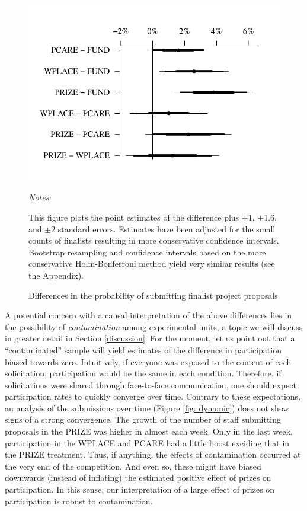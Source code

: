 \documentclass[12pt, titlepage]{article}
\newenvironment{tablenotes}[1][]{
  \begin{minipage}{\textwidth}\emph{Notes:}{\footnotesize #1}
}{\end{minipage}}
\begin{document}
\begin{figure} 
  \centering
  \caption{Differences in the probability of submitting finalist project proposals}
  \label{fig: finalist}
  \includegraphics{Figures/cplot-2.pdf}
  \begin{tablenotes}
  This figure plots the point estimates of the difference plus $\pm 1$, $\pm 1.6$, and $\pm 2$ standard errors. Estimates have been adjusted for the small counts of finalists \citep{agresti2000simple} resulting in more conservative confidence intervals. Bootstrap resampling and confidence intervals based on the more conservative Holm-Bonferroni method yield very similar results (see the Appendix).
  \end{tablenotes}
\end{figure}

A potential concern with a causal interpretation of the above
differences lies in the possibility of \emph{contamination} among
experimental units, a topic we will discuss in greater detail in Section
\ref{discussion}. For the moment, let us point out that a
``contaminated'' sample will yield estimates of the difference in
participation biased towards zero. Intuitively, if everyone was exposed
to the content of each solicitation, participation would be the same in
each condition. Therefore, if solicitations were shared through
face-to-face communication, one should expect participation rates to
quickly converge over time. Contrary to these expectations, an analysis
of the submissions over time (Figure \ref{fig: dynamic}) does not show
signs of a strong convergence. The growth of the number of staff
submitting proposals in the PRIZE was higher in almost each week. Only
in the last week, participation in the WPLACE and PCARE had a little
boost exciding that in the PRIZE treatment. Thus, if anything, the
effects of contamination occurred at the very end of the competition.
And even so, these might have biased downwards (instead of inflating)
the estimated positive effect of prizes on participation. In this sense,
our interpretation of a large effect of prizes on participation is
robust to contamination.
\end{document}
